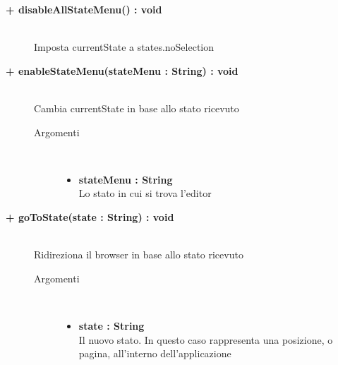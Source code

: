 \begin{description}
\begin{description}
\begin{description}
\begin{itemize}
				\end{itemize}
				
		\end{description}
	\end{description}
	
	
	\begin{description}
		\item[\textbf{\color{blue}+ disableAllStateMenu() : void	}] \hfill \\
			Imposta currentState a states.noSelection 
		
	\end{description}
	
	\begin{description}
		\item[\textbf{\color{blue}+ enableStateMenu(stateMenu : String) : void		}] \hfill \\
			Cambia currentState in base allo stato ricevuto
			
		\begin{description}
			\item[Argomenti] \hfill \\
				\begin{itemize}
				
					\item \textbf{stateMenu : String		} \hfill \\
					Lo stato in cui si trova l'editor
					
				\end{itemize}
				
		\end{description}
	\end{description}
	
	\begin{description}
		\item[\textbf{\color{blue}+ goToState(state : String) : void  	}] \hfill \\
			Ridireziona il browser in base allo stato ricevuto
			
		\begin{description}
			\item[Argomenti] \hfill \\
				\begin{itemize}
				
					\item \textbf{state : String		} \hfill \\
					Il nuovo stato. In questo caso rappresenta una posizione, o pagina, all'interno dell'applicazione					
				\end{itemize}
				

\end{description}
\end{description}
\end{description}
